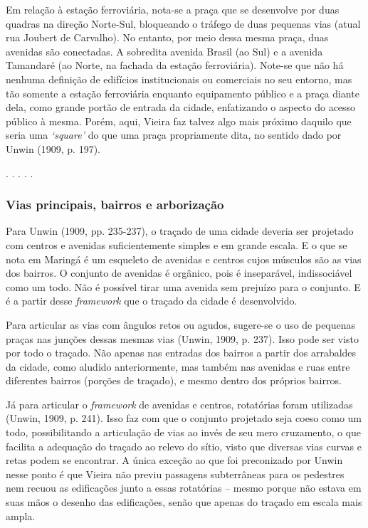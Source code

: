 \documentclass[12pt, a4paper]{book} %
\begin{document}
        Em relação à estação ferroviária, nota-se a praça que se desenvolve por duas quadras na direção Norte-Sul, bloqueando o tráfego de duas pequenas vias (atual rua Joubert de Carvalho). No entanto, por meio dessa mesma praça, duas avenidas são conectadas. A sobredita avenida Brasil (ao Sul) e a avenida Tamandaré (ao Norte, na fachada da estação ferroviária). Note-se que não há nenhuma definição de edifícios institucionais ou comerciais no seu entorno, mas tão somente a estação ferroviária enquanto equipamento público e a praça diante dela, como grande portão de entrada da cidade, enfatizando o aspecto do acesso público à mesma. Porém, aqui, Vieira faz talvez algo mais próximo daquilo que seria uma \textit{`square'} do que uma praça propriamente dita, no sentido dado por Unwin (1909, p. 197).

        \begin{center}
            . . . . .
        \end{center} 

                \subsubsection*{Vias principais, bairros e arborização}

        Para Unwin (1909, pp. 235-237), o traçado de uma cidade deveria ser projetado com centros e avenidas suficientemente simples e em grande escala. E o que se nota em Maringá é um esqueleto de avenidas e centros cujos músculos são as vias dos bairros. O conjunto de avenidas é orgânico, pois é inseparável, indissociável como um todo. Não é possível tirar uma avenida sem prejuízo para o conjunto. E é a partir desse \textit{framework} que o traçado da cidade é desenvolvido.

        Para articular as vias com ângulos retos ou agudos, sugere-se o uso de pequenas praças nas junções dessas mesmas vias (Unwin, 1909, p. 237). Isso pode ser visto por todo o traçado. Não apenas nas entradas dos bairros a partir dos arrabaldes da cidade, como aludido anteriormente, mas também nas avenidas e ruas entre diferentes bairros (porções de traçado), e mesmo dentro dos próprios bairros.

        Já para articular o \textit{framework} de avenidas e centros, rotatórias foram utilizadas (Unwin, 1909, p. 241). Isso faz com que o conjunto projetado seja coeso como um todo, possibilitando a articulação de vias ao invés de seu mero cruzamento, o que facilita a adequação do traçado ao relevo do sítio, visto que diversas vias curvas e retas podem se encontrar. A única exceção ao que foi preconizado por Unwin nesse ponto é que Vieira não previu passagens subterrâneas para os pedestres nem recuou as edificações junto a essas rotatórias – mesmo porque não estava em suas mãos o desenho das edificações, senão que apenas do traçado em escala mais ampla.
\end{document}
